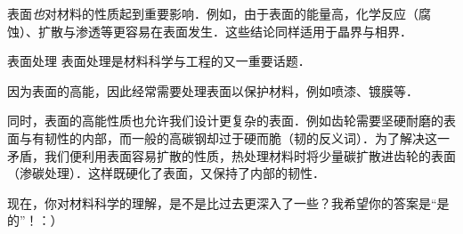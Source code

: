 表面\textsl{也}对材料的性质起到重要影响．例如，由于表面的能量高，化学反应（腐蚀）、扩散与渗透等更容易在表面发生．这些结论同样适用于晶界与相界．

\begin{example}{表面处理}
表面处理是材料科学与工程的又一重要话题．

因为表面的高能，因此经常需要处理表面以保护材料，例如喷漆、镀膜等．

同时，表面的高能性质也允许我们设计更复杂的表面．例如齿轮需要坚硬耐磨的表面与有韧性的内部，而一般的高碳钢却过于硬而脆（韧的反义词）．为了解决这一矛盾，我们便利用表面容易扩散的性质，热处理材料时将少量碳扩散进齿轮的表面（渗碳处理）．这样既硬化了表面，又保持了内部的韧性．
\end{example}

现在，你对材料科学的理解，是不是比过去更深入了一些？我希望你的答案是“是的”！：）
